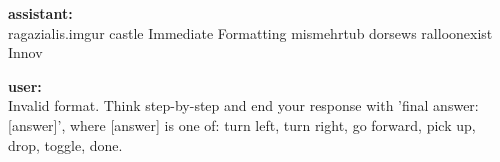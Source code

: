 \documentclass[11pt,a4paper]{article}
\begin{document}
\begin{tcolorbox}
  \begin{tcolorbox}[
    enhanced,
    colback=red!5,
    colframe=red!50,
    boxrule=0.5pt,
    arc=2pt,
    outer arc=2pt,
    top=2pt,
    bottom=2pt,
    left=4pt,
    right=4pt,
    boxsep=2pt
  ]
    \textbf{assistant:}\\[4pt]
    ragazialis.imgur castle Immediate Formatting mismehrtub dorsews ralloonexist Innov
  \end{tcolorbox}

  \begin{tcolorbox}[
    enhanced,
    colback=green!5,
    colframe=green!50!black,
    boxrule=0.5pt,
    arc=2pt,
    outer arc=2pt,
    top=2pt,
    bottom=2pt,
    left=4pt,
    right=4pt,
    boxsep=2pt
  ]
    \textbf{user:}\\[4pt]
    Invalid format. Think step-by-step and end your response with 
    'final answer: [answer]', where [answer] is one of:
    turn left, turn right, go forward, pick up, drop, toggle, done.
  \end{tcolorbox}

\end{tcolorbox}
\end{document}
